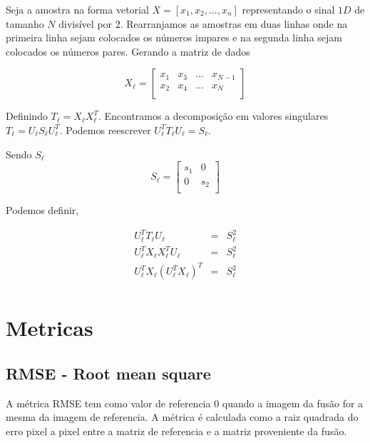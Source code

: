 \documentclass[conference]{IEEEtran}
\begin{document}
Seja a amostra na forma vetorial $X=[x_1,x_2,\dots,x_n]$ representando o sinal $1D$ de tamanho $N$ divisível por 2. Rearranjamos as amostras em duas linhas onde na primeira linha sejam colocados os números impares e na segunda linha sejam colocados os números pares. Gerando a matriz de dados


\begin{equation*}
	X_{\ell} = \left[
\begin{array}{cccc}
	x_1   & x_3 & \dots & x_{N-1}  \\
	x_2   & x_4 & \dots & x_N  \\
\end{array}
\right]
\end{equation*}

Definindo $T_{\ell} = X_{\ell}X_{\ell}^T$. Encontramos a decomposição em valores singulares $T_{\ell}=U_{\ell}S_{\ell}U_{\ell}^T$. Podemos reescrever $U_{\ell}^TT_{\ell}U_{\ell}=S_{\ell}$.

Sendo $S_{\ell}$
\begin{equation*}
	S_{\ell} = \left[
\begin{array}{cc}
	s_1   & 0 \\
	0   & s_2   \\
\end{array}
\right]
\end{equation*}

Podemos definir,
  
\begin{equation*}
\begin{array}{ccc}
	U_{\ell}^TT_{\ell}U_{\ell}&=&S_{\ell}^2 \\
	U_{\ell}^TX_{\ell}X_{\ell}^TU_{\ell}&=&S_{\ell}^2 \\
	U_{\ell}^TX_{\ell}(U_{\ell}^TX_{\ell})^T&=&S_{\ell}^2 \\
\end{array}
\end{equation*}

\section{Metricas}

\subsection{RMSE - Root mean square}
A métrica RMSE tem como valor de referencia $0$ quando a imagem da fusão for a mesma da imagem de referencia. A métrica é calculada como a raiz quadrada do erro pixel a pixel entre a matriz de referencia e a matriz proveniente da fusão.
  
\end{document}
